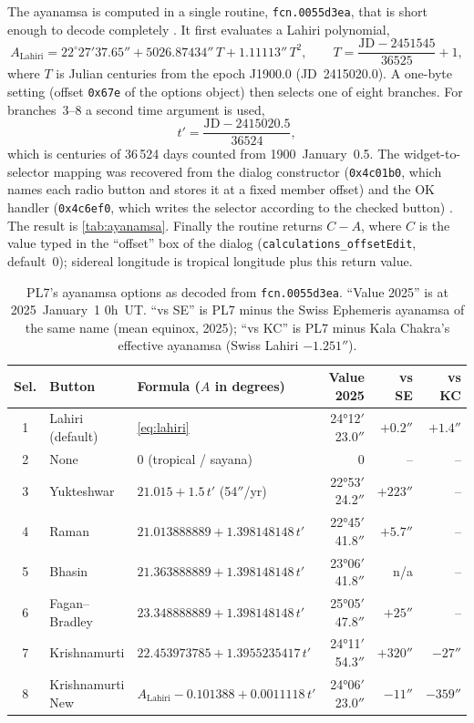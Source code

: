 The ayanamsa is computed in a single routine, \texttt{fcn.0055d3ea}, that is short enough
to decode completely \tagBIN. It first evaluates a Lahiri polynomial,
\begin{equation}
  A_{\text{Lahiri}} = 22^\circ 27' 37.65'' + 5026.87434''\,T + 1.11113''\,T^2,
  \qquad T = \frac{\mathrm{JD} - 2451545}{36525} + 1,
  \label{eq:lahiri}
\end{equation}
where $T$ is Julian centuries from the epoch J1900.0 (JD~2415020.0). A one-byte setting
(offset \texttt{0x67e} of the options object) then selects one of eight branches. For
branches~3--8 a second time argument is used,
\begin{equation}
  t' = \frac{\mathrm{JD} - 2415020.5}{36524},
  \label{eq:tprime}
\end{equation}
which is centuries of 36\,524 days counted from 1900~January~0.5. The widget-to-selector
mapping was recovered from the dialog constructor (\texttt{0x4c01b0}, which names each
radio button and stores it at a fixed member offset) and the OK handler
(\texttt{0x4c6ef0}, which writes the selector according to the checked button)
\tagBIN. The result is \autoref{tab:ayanamsa}. Finally the routine returns
$C - A$, where $C$ is the value typed in the ``offset'' box of the dialog
(\texttt{calculations\_offsetEdit}, default~0); sidereal longitude is tropical longitude
plus this return value.

\begin{table}[htbp]
  \centering
  \small
  \caption[PL7's eight ayanamsa options]{PL7's ayanamsa options as decoded from
  \texttt{fcn.0055d3ea}. ``Value 2025'' is at 2025~January~1 0h~UT. ``vs SE'' is PL7
  minus the Swiss Ephemeris ayanamsa of the same name (mean equinox, 2025); ``vs KC'' is
  PL7 minus Kala Chakra's effective ayanamsa (Swiss Lahiri $- 1.251''$).}
  \label{tab:ayanamsa}
  \begin{tabularx}{\textwidth}{c l >{\raggedright\arraybackslash}X r r r}
    \toprule
    Sel. & Button & Formula ($A$ in degrees) & Value 2025 & vs SE & vs KC \\
    \midrule
    1 & Lahiri (default) & \autoref{eq:lahiri} & 24°12$'$23.0$''$ & $+0.2''$ & $+1.4''$ \\
    2 & None & $0$ (tropical / sayana) & 0 & -- & -- \\
    3 & Yukteshwar & $21.015 + 1.5\,t'$ \;(54$''$/yr) & 22°53$'$24.2$''$ & $+223''$ & -- \\
    4 & Raman & $21.013888889 + 1.398148148\,t'$ & 22°45$'$41.8$''$ & $+5.7''$ & -- \\
    5 & Bhasin & $21.363888889 + 1.398148148\,t'$ & 23°06$'$41.8$''$ & n/a & -- \\
    6 & Fagan--Bradley & $23.348888889 + 1.398148148\,t'$ & 25°05$'$47.8$''$ & $+25''$ & -- \\
    7 & Krishnamurti & $22.453973785 + 1.3955235417\,t'$ & 24°11$'$54.3$''$ & $+320''$ & $-27''$ \\
    8 & Krishnamurti New & $A_{\text{Lahiri}} - 0.101388 + 0.0011118\,t'$ & 24°06$'$23.0$''$ & $-11''$ & $-359''$ \\
    \bottomrule
  \end{tabularx}
\end{table}

